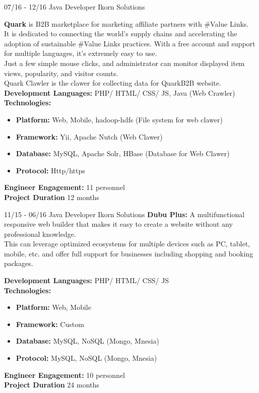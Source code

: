 \documentclass[]{friggeri-cv}
\begin{document}
\begin{entrylist}
\entry
    {07/16 - 12/16}
    {Java Developer}
    {Ikorn Solutions}
	{\textbf{ Quark}  is B2B marketplace for marketing affiliate partners with \#Value Links.\\ 
	It is dedicated to connecting the world’s supply chains and accelerating the adoption of sustainable \#Value Links practices.
	With a free account and support for multiple languages, it’s extremely easy to use.\\
	 Just a few simple mouse clicks, and administrator can monitor displayed item views, popularity, and visitor counts.\\
	Quark Clawler is the clawer for collecting data  for QuarkB2B website.\\

	 \textbf{Development Languages:} PHP/ HTML/ CSS/ JS, Java (Web Crawler) \\ 
	 \textbf{Technologies:}~
			\begin{itemize}
				\item \textbf{Platform:} Web,  Mobile, hadoop-hdfs (File system for web clawer)
				\item \textbf{Framework:} Yii, Apache Nutch (Web Clawer)
				\item \textbf{Database:} MySQL, Apache Solr, HBase (Database for Web Clawer)
				\item \textbf{Protocol:} Http/https
			\end{itemize}
		 \textbf{Engineer Engagement:} 11 personnel\\
		 \textbf{Project Duration} 12  months~
	}
\end{entrylist}

\begin{entrylist}
\entry
    {11/15 - 06/16}
    {Java Developer}
    {Ikorn Solutions}
	{\textbf{ Dubu Plus: } A multifunctional responsive web builder that makes it easy to create a website without any professional knowledge.
	\\ This can leverage optimized ecosystems for multiple devices such as PC, tablet, mobile, etc. and offer full support for businesses including shopping and booking packages.\\
}
\end{entrylist}

\begin{entrylist}
\entry
{}
{}
{}
{
		 \textbf{Development Languages:} PHP/ HTML/ CSS/ JS~\\
		 \textbf{Technologies:}~
			\begin{itemize}
				\item \textbf{Platform:} Web,  Mobile
				\item \textbf{Framework:} Custom
				\item \textbf{Database:} MySQL, NoSQL (Mongo, Mnesia)
				\item \textbf{Protocol:} MySQL, NoSQL (Mongo, Mnesia)
			\end{itemize}
		 \textbf{Engineer Engagement:} 10 personnel\\
		 \textbf{Project Duration} 24  months\\
	}
\end{entrylist}
\end{document}
